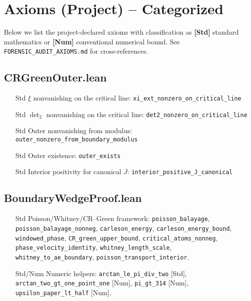 \documentclass[11pt]{article}
\begin{document}
\section*{Axioms (Project) -- Categorized}
Below we list the project-declared axioms with classification as \textbf{[Std]} standard mathematics or \textbf{[Num]} conventional numerical bound. See \texttt{FORENSIC\_AUDIT\_AXIOMS.md} for cross-references.

\subsection*{CRGreenOuter.lean}
\begin{itemize}[leftmargin=*]
  \item [Std] $\xi$ nonvanishing on the critical line: \texttt{xi\_ext\_nonzero\_on\_critical\_line}
  \item [Std] $\operatorname{det}_2$ nonvanishing on the critical line: \texttt{det2\_nonzero\_on\_critical\_line}
  \item [Std] Outer nonvanishing from modulus: \texttt{outer\_nonzero\_from\_boundary\_modulus}
  \item [Std] Outer existence: \texttt{outer\_exists}
  \item [Std] Interior positivity for canonical $J$: \texttt{interior\_positive\_J\_canonical}
\end{itemize}

\subsection*{BoundaryWedgeProof.lean}
\begin{itemize}[leftmargin=*]
  \item [Std] Poisson/Whitney/CR--Green framework: \texttt{poisson\_balayage}, \texttt{poisson\_balayage\_nonneg}, \texttt{carleson\_energy}, \texttt{carleson\_energy\_bound}, \texttt{windowed\_phase}, \texttt{CR\_green\_upper\_bound}, \texttt{critical\_atoms\_nonneg}, \texttt{phase\_velocity\_identity}, \texttt{whitney\_length\_scale}, \texttt{whitney\_to\_ae\_boundary}, \texttt{poisson\_transport\_interior}.
  \item [Std/Num] Numeric helpers: \texttt{arctan\_le\_pi\_div\_two} [Std], \texttt{arctan\_two\_gt\_one\_point\_one} [Num], \texttt{pi\_gt\_314} [Num], \texttt{upsilon\_paper\_lt\_half} [Num].
\end{itemize}
\end{document}
